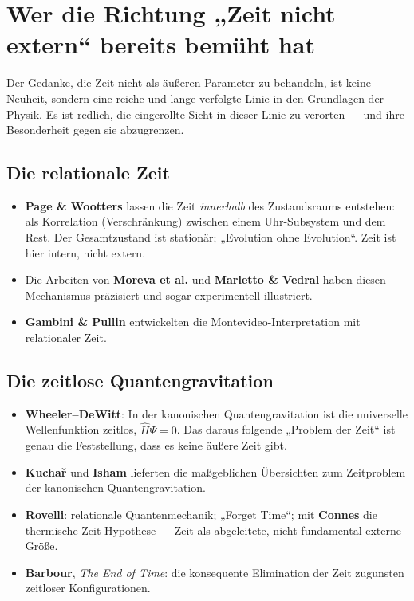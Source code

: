 \section{Wer die Richtung „Zeit nicht extern`` bereits bemüht hat}

Der Gedanke, die Zeit nicht als äußeren Parameter zu behandeln, ist keine Neuheit, sondern eine reiche und lange verfolgte Linie in den Grundlagen der Physik. Es ist redlich, die eingerollte Sicht in dieser Linie zu verorten --- und ihre Besonderheit gegen sie abzugrenzen.

\subsection{Die relationale Zeit}
\begin{itemize}[leftmargin=1.4em,itemsep=0.25em]
 \item \textbf{Page \& Wootters} lassen die Zeit \emph{innerhalb} des Zustandsraums entstehen: als Korrelation (Verschränkung) zwischen einem Uhr-Subsystem und dem Rest. Der Gesamtzustand ist stationär; „Evolution ohne Evolution``. Zeit ist hier intern, nicht extern.
 \item Die Arbeiten von \textbf{Moreva et al.} und \textbf{Marletto \& Vedral} haben diesen Mechanismus präzisiert und sogar experimentell illustriert.
 \item \textbf{Gambini \& Pullin} entwickelten die Montevideo-Interpretation mit relationaler Zeit.
\end{itemize}

\subsection{Die zeitlose Quantengravitation}
\begin{itemize}[leftmargin=1.4em,itemsep=0.25em]
 \item \textbf{Wheeler--DeWitt}: In der kanonischen Quantengravitation ist die universelle Wellenfunktion zeitlos, $\hat{H}\Psi = 0$. Das daraus folgende „Problem der Zeit`` ist genau die Feststellung, dass es keine äußere Zeit gibt.
 \item \textbf{Kuchař} und \textbf{Isham} lieferten die maßgeblichen Übersichten zum Zeitproblem der kanonischen Quantengravitation.
 \item \textbf{Rovelli}: relationale Quantenmechanik; „Forget Time``; mit \textbf{Connes} die thermische-Zeit-Hypothese --- Zeit als abgeleitete, nicht fundamental-externe Größe.
 \item \textbf{Barbour}, \emph{The End of Time}: die konsequente Elimination der Zeit zugunsten zeitloser Konfigurationen.
\end{itemize}

